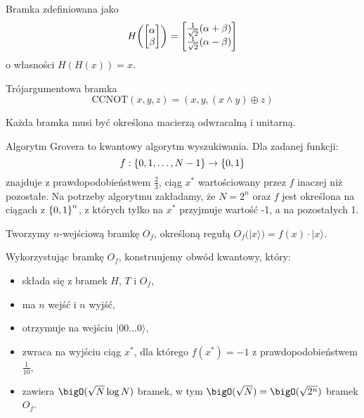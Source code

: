 \begin{definition}
    Bramka zdefiniowana jako
    \[
        H\pars{\begin{bmatrix} \alpha \\ \beta \end{bmatrix}} = \begin{bmatrix} \frac{1}{\sqrt{2}}(\alpha + \beta) \\ \frac{1}{\sqrt{2}}(\alpha - \beta) \end{bmatrix}
    \]
    o własności \( H(H(x)) = x \).
\end{definition}

\begin{definition}
    Trójargumentowa bramka
    \[ \text{CCNOT}(x, y, z) = (x, y, (x \land y) \oplus z) \]
\end{definition}
Każda bramka musi być określona macierzą odwracalną i unitarną.

Algorytm Grovera to kwantowy algorytm wyszukiwania. Dla zadanej funkcji:
\[
    f : \set{0, 1, \ldots, N - 1} \rightarrow \set{0, 1}
\]
znajduje z prawdopodobieństwem \( \frac{2}{3} \), ciąg \( x^{*} \) wartościowany przez \( f \) inaczej niż pozostałe.
Na potrzeby algorytmu zakładamy, że \( N = 2^n \) oraz \( f \) jest określona na ciągach z \( \set{0, 1}^n \), z których tylko na \( x^{*} \) przyjmuje wartość -1, a na pozostałych 1.

Tworzymy \( n \)-wejściową bramkę \( O_f \), określoną regułą \( O_f (|x\rangle) = f(x) \cdot |x \rangle \).

Wykorzystując bramkę \( O_f \), konstruujemy obwód kwantowy, który:
\begin{itemize}
    \item składa się z bramek \( H \), \( T \) i \( O_f \),
    \item ma \( n \) wejść i \( n \) wyjść,
    \item otrzymuje na wejściu \( |00\ldots0 \rangle \),
    \item zwraca na wyjściu ciąg \( x^{*} \), dla którego \( f(x^{*}) = -1 \) z prawdopodobieństwem \( \frac{1}{10} \),
    \item zawiera \( \bigO(\sqrt{N} \log N) \) bramek, w tym \( \bigO(\sqrt{N}) = \bigO(\sqrt{2^n}) \) bramek \( O_f \).
\end{itemize}

